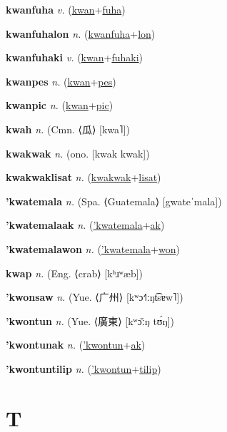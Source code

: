 \textbf{\hypertarget{kwanfuha}{kwanfuha}} \textit{v.} (\hyperlink{kwan}{kwan}+\allowbreak \hyperlink{fuha}{fuha})


\textbf{\hypertarget{kwanfuhalon}{kwanfuhalon}} \textit{n.} (\hyperlink{kwanfuha}{kwanfuha}+\allowbreak \hyperlink{lon}{lon})


\textbf{\hypertarget{kwanfuhaki}{kwanfuhaki}} \textit{v.} (\hyperlink{kwan}{kwan}+\allowbreak \hyperlink{fuhaki}{fuhaki})


\textbf{\hypertarget{kwanpes}{kwanpes}} \textit{n.} (\hyperlink{kwan}{kwan}+\allowbreak \hyperlink{pes}{pes})


\textbf{\hypertarget{kwanpic}{kwanpic}} \textit{n.} (\hyperlink{kwan}{kwan}+\allowbreak \hyperlink{pic}{pic})


\textbf{\hypertarget{kwah}{kwah}} \textit{n.} (Cmn. ⟨{\chinese{}瓜}⟩ [kwa˥])


\textbf{\hypertarget{kwakwak}{kwakwak}} \textit{n.} (ono. [kwak kwak])


\textbf{\hypertarget{kwakwaklisat}{kwakwaklisat}} \textit{n.} (\hyperlink{kwakwak}{kwakwak}+\allowbreak \hyperlink{lisat}{lisat})


\textbf{\hypertarget{'kwatemala}{'kwatemala}} \textit{n.} (Spa. ⟨Guatemala⟩ [gwateˈmala])


\textbf{\hypertarget{'kwatemalaak}{'kwatemalaak}} \textit{n.} (\hyperlink{'kwatemala}{'kwatemala}+\allowbreak \hyperlink{ak}{ak})


\textbf{\hypertarget{'kwatemalawon}{'kwatemalawon}} \textit{n.} (\hyperlink{'kwatemala}{'kwatemala}+\allowbreak \hyperlink{won}{won})


\textbf{\hypertarget{kwap}{kwap}} \textit{n.} (Eng. ⟨crab⟩ [kʰɹʷæb])


\textbf{\hypertarget{'kwonsaw}{'kwonsaw}} \textit{n.} (Yue. ⟨{\chinese{}广州}⟩ [kʷɔ˧˥ːŋt͡sɐw˥])


\textbf{\hypertarget{'kwontun}{'kwontun}} \textit{n.} (Yue. ⟨{\chinese{}廣東}⟩ [kʷɔ̌ːŋ tʊ́ŋ])


\textbf{\hypertarget{'kwontunak}{'kwontunak}} \textit{n.} (\hyperlink{'kwontun}{'kwontun}+\allowbreak \hyperlink{ak}{ak})


\textbf{\hypertarget{'kwontuntilip}{'kwontuntilip}} \textit{n.} (\hyperlink{'kwontun}{'kwontun}+\allowbreak \hyperlink{tilip}{tilip})


\section{T}


